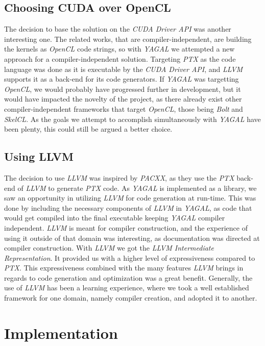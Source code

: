 \subsection*{Choosing CUDA over OpenCL}
The decision to base the solution on the \textit{CUDA Driver API} was another interesting one. The related works, that are compiler-independent, are building the kernels as \textit{OpenCL} code strings, so with \textit{YAGAL} we attempted a new approach for a compiler-independent solution. Targeting \textit{PTX} as the code language was done as it is executable by the \textit{CUDA Driver API}, and \textit{LLVM} supports it as a back-end for its code generators. If \textit{YAGAL} was targetting \textit{OpenCL}, we would probably have progressed further in development, but it would have impacted the novelty of the project, as there already exist other compiler-independent frameworks that target \textit{OpenCL}, those being \textit{Bolt} and \textit{SkelCL}. As the goals we attempt to accomplish simultaneously with \textit{YAGAL} have been plenty, this could still be argued a better choice.

\subsection*{Using LLVM}
The decision to use \textit{LLVM} was inspired by \textit{PACXX}, as they use the \textit{PTX} back-end of \textit{LLVM} to generate \textit{PTX} code. As \textit{YAGAL} is implemented as a library, we saw an opportunity in utilizing \textit{LLVM} for code generation at run-time. This was done by including the necessary components of \textit{LLVM} in \textit{YAGAL}, as code that would get compiled into the final executable keeping \textit{YAGAL} compiler independent. \textit{LLVM} is meant for compiler construction, and the experience of using it outside of that domain was interesting, as documentation was directed at compiler construction. With \textit{LLVM} we got the \textit{LLVM Intermediate Representation}. It provided us with a higher level of expressiveness compared to \textit{PTX}. This expressiveness combined with the many features \textit{LLVM} brings in regards to code generation and optimization was a great benefit. Generally, the use of \textit{LLVM} has been a learning experience, where we took a well established framework for one domain, namely compiler creation, and adopted it to another.

\section*{Implementation}


